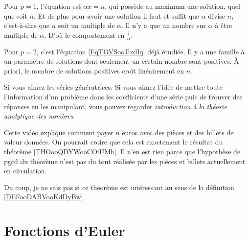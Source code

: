 \begin{example}
    Pour \( p=1\), l'équation est \( \alpha x=n\), qui possède au maximum une solution, quel que soit \( n\). Et de plus pour avoir une solution il faut et suffit que \( \alpha\) divise \( n\), c'est-à-dire que \( n\) soit un multiple de \( \alpha\). Il n'y a que un nombre sur \( \alpha\) à être multiple de \( \alpha\). D'où le comportement en \( \frac{1}{ \alpha }\).

    Pour \( p=2\), c'est l'équation \eqref{EqTOVSooJbxlIq} déjà étudiée. Il y a une famille à un paramètre de solutions dont seulement un certain nombre sont positives. À priori, le nombre de solutions positives croît linéairement en \( n\).
\end{example}


\begin{normaltext}
    Si vous aimez les séries génératrices. Si vous aimez l'idée de mettre toute l'information d'un problème dans les coefficients d'une série puis de trouver des réponses en les manipulant, vous pouvez regarder \emph{introduction à la théorie analytique des nombres}\cite{BIBooOSKTooBuVtBB}.

    Cette vidéo explique comment payer \( n\) euros avec des pièces et des billets de valeur données. On pourrait croire que cela est exactement le résultat du théorème \ref{THOooQDYWooCOiUMb}. Il n'en est rien parce que l'hypothèse de pgcd du théorème n'est pas du tout réalisée par les pièces et billets actuellement en circulation.

    Du coup, je ne sais pas si ce théorème est intéressant au sens de la définition \ref{DEFooDABVooKdDyBw}.
\end{normaltext}

\section{Fonctions d'Euler}

